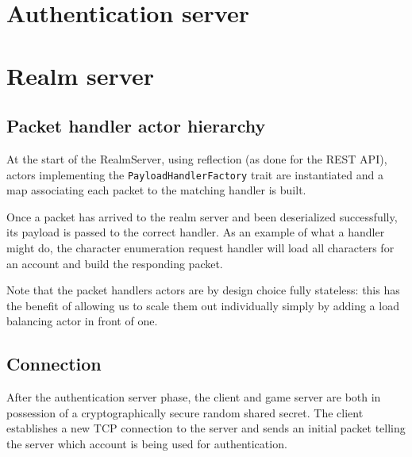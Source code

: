 \documentclass[paper=a4, fontsize=11pt]{scrartcl}
\begin{document}
\section{Authentication server}


\section{Realm server}


\subsection{Packet handler actor hierarchy}

At the start of the RealmServer, using reflection (as done for the REST API),
actors implementing the \texttt{PayloadHandlerFactory} trait are instantiated
and a map associating each packet to the matching handler is built.

Once a packet has arrived to the realm server and been deserialized
successfully, its payload is passed to the correct handler.
As an example of what a handler might do, the character enumeration request
handler will load all characters for an account and build the responding packet.

Note that the packet handlers actors are by design choice fully stateless: this
has the benefit of allowing us to scale them out individually simply by adding a
load balancing actor in front of one.

\subsection{Connection}

After the authentication server phase, the client and game server are both in
possession of a cryptographically secure random shared secret.
The client establishes a new TCP connection to the server and sends an initial
packet telling the server which account is being used for authentication.
\end{document}
